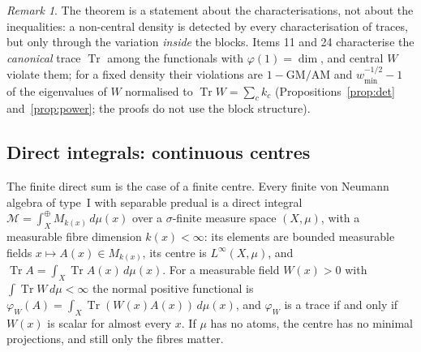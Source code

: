 \documentclass[11pt]{article}
\DeclareMathOperator{\Tr}{Tr}
\newcommand{\M}{\mathcal{M}}
\theoremstyle{plain}
\theoremstyle{definition}
\theoremstyle{remark}
\newtheorem{remark}[theorem]{Remark}
\begin{document}
\begin{remark}
The theorem is a statement about the characterisations, not about the inequalities: a non-central density is detected by
every characterisation of traces, but only through the variation \emph{inside} the blocks. Items 11 and 24 characterise
the \emph{canonical} trace $\Tr$ among the functionals with $\varphi(1)=\dim$, and central $W$ violate them; for a fixed
density their violations are $1-\mathrm{GM}/\mathrm{AM}$ and $w_{\min}^{-1/2}-1$ of the eigenvalues of $W$ normalised to
$\Tr W=\sum_ck_c$ (Propositions~\ref{prop:det} and~\ref{prop:power}; the proofs do not use the block structure).
\end{remark}

\subsection{Direct integrals: continuous centres}\label{sec:integral}

The finite direct sum is the case of a finite centre. Every finite von Neumann algebra of type~I with separable predual is
a direct integral $\M=\int^\oplus_XM_{k(x)}\,d\mu(x)$ over a $\sigma$-finite measure space $(X,\mu)$, with a measurable
fibre dimension $k(x)<\infty$: its elements are bounded measurable fields $x\mapsto A(x)\in M_{k(x)}$, its centre is
$L^\infty(X,\mu)$, and $\Tr A=\int_X\Tr A(x)\,d\mu(x)$. For a measurable field $W(x)>0$ with $\int\Tr W\,d\mu<\infty$ the
normal positive functional is $\varphi_W(A)=\int_X\Tr(W(x)A(x))\,d\mu(x)$, and $\varphi_W$ is a trace if and only if
$W(x)$ is scalar for almost every $x$. If $\mu$ has no atoms, the centre has no minimal projections, and still only the
fibres matter.
\end{document}
